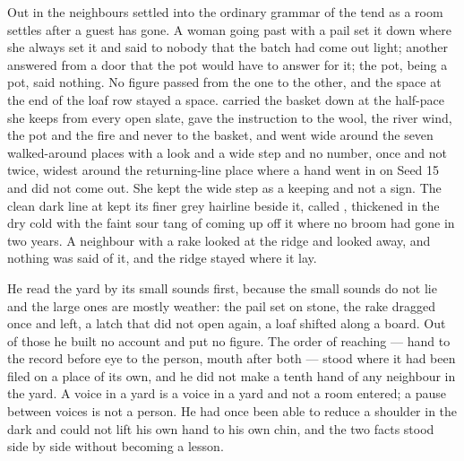 Out in  the neighbours settled into the ordinary grammar of the tend as a room settles after a guest has gone. A woman going past with a pail set it down where she always set it and said to nobody that the batch had come out light; another answered from a door that the pot would have to answer for it; the pot, being a pot, said nothing. No figure passed from the one to the other, and the space at the end of the loaf row stayed a space.  carried the basket down at the half-pace she keeps from every open slate, gave the instruction to the wool, the river wind, the pot and the fire and never to the basket, and went wide around the seven walked-around places with a look and a wide step and no number, once and not twice, widest around the returning-line place where a hand went in on Seed 15 and did not come out. She kept the wide step as a keeping and not a sign. The clean dark line at  kept its finer grey hairline beside it, called , thickened in the dry cold with the faint sour tang of  coming up off it where no broom had gone in two years. A neighbour with a rake looked at the ridge and looked away, and nothing was said of it, and the ridge stayed where it lay.

He read the yard by its small sounds first, because the small sounds do not lie and the large ones are mostly weather: the pail set on stone, the rake dragged once and left, a latch that did not open again, a loaf shifted along a board. Out of those he built no account and put no figure. The order of reaching — hand to the record before eye to the person, mouth after both — stood where it had been filed on a place of its own, and he did not make a tenth hand of any neighbour in the yard. A voice in a yard is a voice in a yard and not a room entered; a pause between voices is not a person. He had once been able to reduce a shoulder in the dark and could not lift his own hand to his own chin, and the two facts stood side by side without becoming a lesson.

\scenebreak

